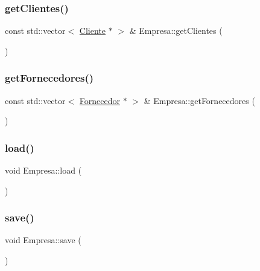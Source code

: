 \mbox{\label{classEmpresa_a472beae89ee1187e1ec3f70e9d4a99ef}} 
\subsubsection{\texorpdfstring{get\+Clientes()}{getClientes()}}
{\footnotesize\ttfamily const std\+::vector$<$ \hyperlink{classCliente}{Cliente} $\ast$ $>$ \& Empresa\+::get\+Clientes (\begin{DoxyParamCaption}{ }\end{DoxyParamCaption})}

\mbox{\label{classEmpresa_aaf131a375aa70819205744328a4dbc07}} 
\subsubsection{\texorpdfstring{get\+Fornecedores()}{getFornecedores()}}
{\footnotesize\ttfamily const std\+::vector$<$ \hyperlink{classFornecedor}{Fornecedor} $\ast$ $>$ \& Empresa\+::get\+Fornecedores (\begin{DoxyParamCaption}{ }\end{DoxyParamCaption})}

\mbox{\label{classEmpresa_a3445c3c507b4f45d1d7831908ff4cdf1}} 
\subsubsection{\texorpdfstring{load()}{load()}}
{\footnotesize\ttfamily void Empresa\+::load (\begin{DoxyParamCaption}{ }\end{DoxyParamCaption})}

\mbox{\label{classEmpresa_afbde694da902870437443de43dae8071}} 
\subsubsection{\texorpdfstring{save()}{save()}}
{\footnotesize\ttfamily void Empresa\+::save (\begin{DoxyParamCaption}{ }\end{DoxyParamCaption})}



